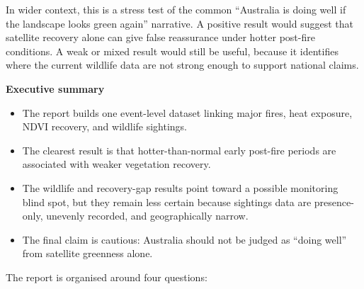 \documentclass[
  letterpaper,
  DIV=11,
  numbers=noendperiod]{scrartcl}
\providecommand{\tightlist}{%
  \setlength{\itemsep}{0pt}\setlength{\parskip}{0pt}}
\begin{document}
In wider context, this is a stress test of the common ``Australia is
doing well if the landscape looks green again'' narrative. A positive
result would suggest that satellite recovery alone can give false
reassurance under hotter post-fire conditions. A weak or mixed result
would still be useful, because it identifies where the current wildlife
data are not strong enough to support national claims.

\begin{tcolorbox}[enhanced jigsaw, left=2mm, opacityback=0, colback=white, breakable, arc=.35mm, bottomrule=.15mm, rightrule=.15mm, toprule=.15mm, colframe=quarto-callout-tip-color-frame, leftrule=.75mm]
\begin{minipage}[t]{5.5mm}
\textcolor{quarto-callout-tip-color}{\faLightbulb}
\end{minipage}%
\begin{minipage}[t]{\textwidth - 5.5mm}

\vspace{-3mm}\textbf{Executive summary}\vspace{3mm}

\begin{itemize}
\tightlist
\item
  The report builds one event-level dataset linking major fires, heat
  exposure, NDVI recovery, and wildlife sightings.
\item
  The clearest result is that hotter-than-normal early post-fire periods
  are associated with weaker vegetation recovery.
\item
  The wildlife and recovery-gap results point toward a possible
  monitoring blind spot, but they remain less certain because sightings
  data are presence-only, unevenly recorded, and geographically narrow.
\item
  The final claim is cautious: Australia should not be judged as ``doing
  well'' from satellite greenness alone.
\end{itemize}

\end{minipage}%
\end{tcolorbox}

The report is organised around four questions:
\end{document}
